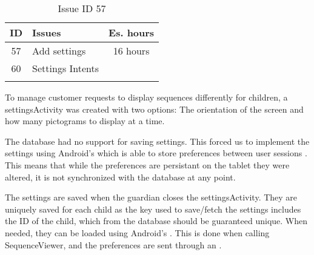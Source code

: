 \begin{longtable} { | c | p{12cm} | c | } 
\hline
	ID 	&	Issues	&		 Es. hours \\\hline
	57	&	Add settings	&	16 hours	\\\hline
	60	&	Settings Intents & \\\hline
\caption{Issue ID 57}
\label{tab:spr4_addsettings}
\end{longtable}

To manage customer requests to display sequences differently for children, a settingsActivity was created with two options: The orientation of the screen and how many pictograms to display at a time.

The database had no support for saving settings. This forced us to implement the settings using Android's  which is able to store preferences between user sessions \cite{sharedpreferences}. This means that while the preferences are persistant on the tablet they were altered, it is not synchronized with the database at any point.

The settings are saved when the guardian closes the settingsActivity. They are uniquely saved for each child as the key used to save/fetch the settings includes the ID of the child, which from the database should be guaranteed unique. When needed, they can be loaded using Android's . This is done when calling SequenceViewer, and the preferences are sent through an .